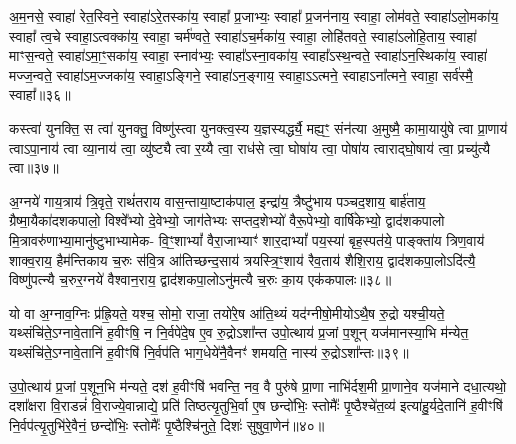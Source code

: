 अ॒म॒नसे॒ स्वाहा॑ रेत॒स्विने॒ स्वाहा॑\-ऽरे॒तस्का॑य॒ स्वाहा᳚ प्र॒जाभ्यः॒ स्वाहा᳚ प्र॒जन॑नाय॒ स्वाहा॒ लोम॑वते॒ स्वाहा॑\-ऽलो॒मका॑य॒ स्वाहा᳚ त्व॒चे स्वाहा॒\-ऽत्वक्का॑य॒ स्वाहा॒ चर्म॑ण्वते॒ स्वाहा॑\-ऽच॒र्मका॑य॒ स्वाहा॒ लोहि॑तवते॒ स्वाहा॑\-ऽलोहि॒ताय॒ स्वाहा॑ माꣳस॒न्वते॒ स्वाहा॑\-ऽमा॒ꣳ॒सका॑य॒ स्वाहा॒ स्नाव॑भ्यः॒ स्वाहा᳚\-ऽस्ना॒वका॑य॒ स्वाहा᳚\-ऽस्थ॒न्वते॒ स्वाहा॑\-ऽन॒स्थिका॑य॒ स्वाहा॑ मज्ज॒न्वते॒ स्वाहा॑\-ऽम॒ज्जका॑य॒ स्वाहा॒\-ऽङ्गिने॒ स्वाहा॑\-ऽन॒ङ्गाय॒ स्वाहा॒\-ऽ\-ऽत्मने॒ स्वाहा\-ऽना᳚त्मने॒ स्वाहा॒ सर्व॑स्मै॒ स्वाहा᳚॥३६॥

{\anuvakamend[{म॒न॒स्विने॒ स्वाहा\-ऽना᳚त्मने॒ स्वाहा॒ द्वे च॑॥12॥}]}

कस्त्वा॑ युनक्ति॒ स त्वा॑ युनक्तु॒ विष्णु॑स्त्वा युनक्त्व॒स्य य॒ज्ञस्यर्द्ध्यै॒ मह्य॒ꣳ॒ संन॑त्या अ॒मुष्मै॒ कामा॒यायु॑षे त्वा प्रा॒णाय॑ त्वा\-ऽपा॒नाय॑ त्वा व्या॒नाय॑ त्वा॒ व्यु॑ष्ट्यै त्वा र॒य्यै त्वा॒ राध॑से त्वा॒ घोषा॑य त्वा॒ पोषा॑य त्वाराद्घो॒षाय॑ त्वा॒ प्रच्यु॑त्यै त्वा॥३७॥

{\anuvakamend[{कस्त्वा॒\-ऽष्टात्रिꣳ॑शत्॥13॥}]}

अ॒ग्नये॑ गाय॒त्राय॑ त्रि॒वृते॒ राथं॑तराय वास॒न्ताया॒ष्टाक॑पाल॒ इन्द्रा॑य॒ त्रैष्टु॑भाय पञ्चद॒शाय॒ बार्\mbox{}ह॑ताय॒ ग्रैष्मा॒यैका॑दशकपालो॒ विश्वे᳚भ्यो दे॒वेभ्यो॒ जाग॑तेभ्यः सप्तद॒शेभ्यो॑ वैरू॒पेभ्यो॒ वार्\mbox{}षि॑केभ्यो॒ द्वाद॑शकपालो मि॒त्रावरु॑णाभ्या॒मानु॑ष्टुभाभ्यामेक- वि॒ꣳ॒शा\-भ्यां᳚ वैरा॒जाभ्याꣳ॑ शार॒दा\-भ्यां᳚ पय॒स्या॑ बृह॒स्पत॑ये॒ पाङ्क्ता॑य त्रिण॒वाय॑ शाक्व॒राय॒ हैम॑न्तिकाय च॒रुः स॑वि॒त्र आ॑तिच्छन्द॒साय॑ त्रयस्त्रि॒ꣳ॒शाय॑ रैव॒ताय॑ शैशि॒राय॒ द्वाद॑शकपा॒लो\-ऽदि॑त्यै॒ विष्णु॑पत्न्यै च॒रुर॒ग्नये॑ वैश्वान॒राय॒ द्वाद॑शकपा॒लो\-ऽनु॑मत्यै च॒रुः का॒य एक॑कपालः॥३८॥

{\anuvakamend[{अ॒ग्नये\-ऽदि॑त्या॒ अनु॑मत्यै स॒प्तच॑त्वारिꣳशत्॥14॥}]}

यो वा अ॒ग्नाव॒ग्निः प्र॑ह्रि॒यते॒ यश्च॒ सोमो॒ राजा॒ तयो॑रे॒ष आ॑ति॒थ्यं यद॑ग्नीषो॒मीयो\-ऽथै॒ष रु॒द्रो यश्ची॒यते॒ यथ्संचि॑ते॒\-ऽग्नावे॒तानि॑ ह॒वीꣳषि॒ न नि॒र्वपे॑दे॒ष ए॒व रु॒द्रो\-ऽशा᳚न्त उपो॒त्थाय॑ प्र॒जां प॒शून् यज॑मानस्या॒भि म॑न्येत॒ यथ्संचि॑ते॒\-ऽग्नावे॒तानि॑ ह॒वीꣳषि॑ नि॒र्वप॑ति भाग॒धेये॑नै॒वैनꣳ॑ शमयति॒ नास्य॑ रु॒द्रो\-ऽशा᳚न्तः॥३९॥

उ॒पो॒त्थाय॑ प्र॒जां प॒शून॒भि म॑न्यते॒ दश॑ ह॒वीꣳषि॑ भवन्ति॒ नव॒ वै पुरु॑षे प्रा॒णा नाभि॑र्दश॒मी प्रा॒णाने॒व यज॑माने दधा॒त्यथो॒ दशा᳚क्षरा वि॒राडन्नं॑ वि॒राज्ये॒वान्नाद्ये॒ प्रति॑ तिष्ठत्यृ॒तुभि॒र्वा ए॒ष छन्दो॑भिः॒ स्तोमैः᳚ पृ॒ष्ठैश्चे॑त॒व्य॑ इत्या॑हु॒र्यदे॒तानि॑ ह॒वीꣳषि॑ नि॒र्वप॑त्यृ॒तुभि॑रे॒वैनं॒ छन्दो॑भिः॒ स्तोमैः᳚ पृ॒ष्ठैश्चि॑नुते॒ दिशः॑ सुषुवा॒णेन॑॥४०॥


